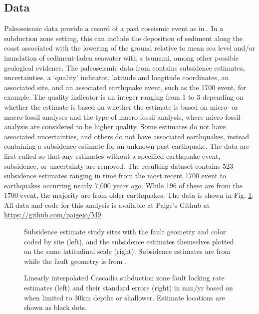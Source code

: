 {\subsection{Data}
\label{data}
Paleoseismic data provide a record of a past coseismic event as in \citet{leonard2010}.  In a subduction zone setting, this can include the deposition of sediment along the coast associated with the lowering of the ground relative to mean sea level and/or inundation of sediment-laden seawater with a tsunami, among other possible geological evidence.  The paleoseismic data from \citet{leonard2010} contains subsidence estimates, uncertainties, a `quality' indicator, latitude and longitude coordinates, an associated site, and an associated earthquake event, such as the 1700 event, for example.  The quality indicator is an integer ranging from 1 to 3 depending on whether the estimate is based on whether the estimate is based on micro- or macro-fossil analyses and the type of macro-fossil analysis, where micro-fossil analysis are considered to be higher quality.  Some estimates do not have associated uncertainties, and others do not have associated earthquakes, instead containing a subsidence estimate for an unknown past earthquake.  The data are first culled so that any estimates without a specified earthquake event, subsidence, or uncertainty are removed.  The resulting dataset contains 523 subsidence estimates ranging in time from the most recent 1700 event to earthquakes occurring nearly 7,000 years ago.  While 196 of these are from the 1700 event, the majority are from older earthquakes.  The data is shown in Fig. \ref{subsidence}.  All data and code for this analysis is available at Paige's Github at \url{https://github.com/paigejo/M9}.

\begin{figure}
\centering
{}
\caption{Subsidence estimate study sites with the fault geometry and color coded by site (left), and the subsidence estimates themselves plotted on the same latitudinal scale (right).  Subsidence estimates are from \citet{leonard2010} while the fault geometry is from \citet{faultGeom}.}
\label{subsidence}
\end{figure}

\begin{figure}
\centering
{}
\caption{Linearly interpolated Cascadia subduction zone fault locking rate estimates (left) and their standard errors (right) in mm/yr based on \citet{evans2015} when limited to 30km depths or shallower. Estimate locations are shown as black dots.}
\label{locking}
\end{figure}

}
